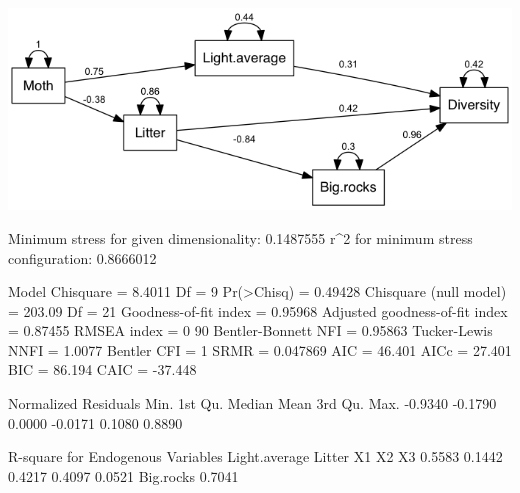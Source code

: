 \documentclass[12pt]{article}
\begin{document}
\includegraphics{semPathD.png}

\pagebreak

\begin{Schunk}
\begin{Soutput}
Minimum stress for given dimensionality:  0.1487555 
r^2 for minimum stress configuration:  0.8666012 
\end{Soutput}
\begin{Soutput}
 Model Chisquare =  8.4011   Df =  9 Pr(>Chisq) = 0.49428
 Chisquare (null model) =  203.09   Df =  21
 Goodness-of-fit index =  0.95968
 Adjusted goodness-of-fit index =  0.87455
 RMSEA index =  0   90%
 Bentler-Bonnett NFI =  0.95863
 Tucker-Lewis NNFI =  1.0077
 Bentler CFI =  1
 SRMR =  0.047869
 AIC =  46.401
 AICc =  27.401
 BIC =  86.194
 CAIC =  -37.448

 Normalized Residuals
   Min. 1st Qu.  Median    Mean 3rd Qu.    Max. 
-0.9340 -0.1790  0.0000 -0.0171  0.1080  0.8890 

 R-square for Endogenous Variables
Light.average        Litter            X1            X2            X3 
       0.5583        0.1442        0.4217        0.4097        0.0521 
    Big.rocks 
       0.7041 


\end{Soutput}
\end{Schunk}
\end{document}
